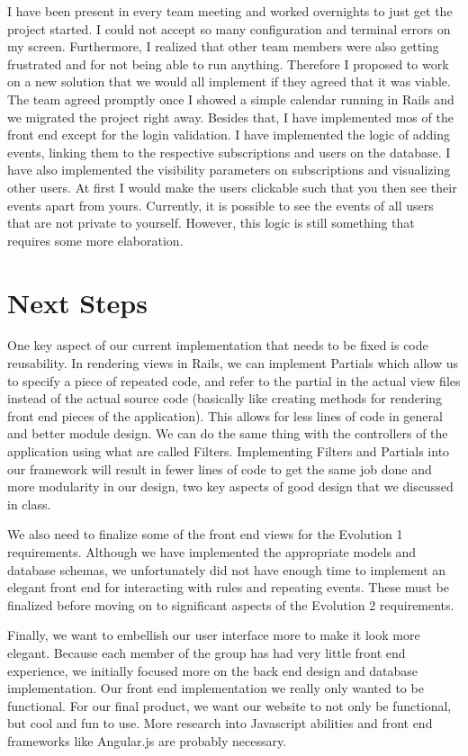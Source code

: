 \documentclass[11pt]{article}
\begin{document}
I have been present in every team meeting and worked overnights to just get the project started. I could not accept so many configuration and terminal errors on my screen. Furthermore, I realized that other team members were also getting frustrated and for not being able to run anything. Therefore I proposed to work on a new solution that we would all implement if they agreed that it was viable. The team agreed promptly once I showed a simple calendar running in Rails and we migrated the project right away. Besides that, I have implemented mos of the front end except for the login validation. I have implemented the logic of adding events, linking them to the respective subscriptions and users on the database. I have also implemented the visibility parameters on subscriptions and visualizing other users. At first I would make the users clickable such that you then see their events apart from yours. Currently, it is possible to see the events of all users that are not private to yourself. However, this logic is still something that requires some more elaboration.

\section{Next Steps}

One key aspect of our current implementation that needs to be fixed is code reusability.  In rendering views in Rails, we can implement Partials which allow us to specify a piece of repeated code, and refer to the partial in the actual view files instead of the actual source code (basically like creating methods for rendering front end pieces of the application).  This allows for less lines of code in general and better module design.  We can do the same thing with the controllers of the application using what are called Filters.  Implementing Filters and Partials into our framework will result in fewer lines of code to get the same job done and more modularity in our design, two key aspects of good design that we discussed in class.

We also need to finalize some of the front end views for the Evolution 1 requirements.  Although we have implemented the appropriate models and database schemas, we unfortunately did not have enough time to implement an elegant front end for interacting with rules and repeating events.  These must be finalized before moving on to significant aspects of the Evolution 2 requirements.

Finally, we want to embellish our user interface more to make it look more elegant.  Because each member of the group has had very little front end experience, we initially focused more on the back end design and database implementation.  Our front end implementation we really only wanted to be functional.  For our final product, we want our website to not only be functional, but cool and fun to use.  More research into Javascript abilities and front end frameworks like Angular.js are probably necessary.
\end{document}
